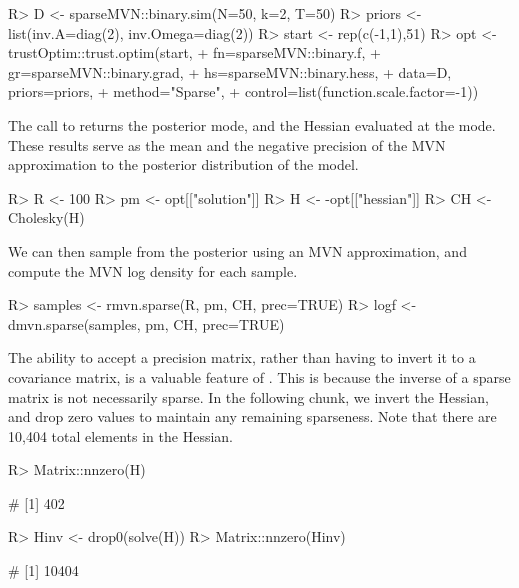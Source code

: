 \documentclass[codesnippet,nojss]{jss}\usepackage[]{graphicx}\usepackage[]{color}
\newcommand{\func}[1]{\code{#1}}
\begin{document}
\begin{Schunk}
\begin{Sinput}
R> D <- sparseMVN::binary.sim(N=50, k=2, T=50)
R> priors <- list(inv.A=diag(2), inv.Omega=diag(2))
R> start <- rep(c(-1,1),51)
R> opt <- trustOptim::trust.optim(start,
+                                fn=sparseMVN::binary.f,
+                                gr=sparseMVN::binary.grad,
+                                hs=sparseMVN::binary.hess,
+                                data=D, priors=priors,
+                                method="Sparse",
+                                control=list(function.scale.factor=-1))
\end{Sinput}
\end{Schunk}

The call to \func{trust.optim} returns the posterior mode, and the
Hessian evaluated at the mode. These results serve as the mean and the negative precision
of the MVN approximation to the posterior distribution of the model.

\begin{Schunk}
\begin{Sinput}
R> R <- 100
R> pm <- opt[["solution"]]
R> H <- -opt[["hessian"]]
R> CH <- Cholesky(H)
\end{Sinput}
\end{Schunk}

We can then sample from the posterior using an MVN approximation, and compute the MVN log density for each sample.

\begin{Schunk}
\begin{Sinput}
R> samples <- rmvn.sparse(R, pm, CH, prec=TRUE)
R> logf <- dmvn.sparse(samples, pm, CH, prec=TRUE)
\end{Sinput}
\end{Schunk}

The ability to accept a precision matrix, rather than having to invert
it to a covariance matrix, is a valuable feature of .
This is because the inverse of a sparse matrix is not necessarily
sparse. In the following chunk, we invert the Hessian, and drop zero
values to maintain any remaining sparseness. Note that there are
10,404 total elements in the Hessian.

\begin{Schunk}
\begin{Sinput}
R> Matrix::nnzero(H)
\end{Sinput}
\begin{Soutput}
# [1] 402
\end{Soutput}
\begin{Sinput}
R> Hinv <- drop0(solve(H))
R> Matrix::nnzero(Hinv)
\end{Sinput}
\begin{Soutput}
# [1] 10404
\end{Soutput}
\end{Schunk}
\end{document}

